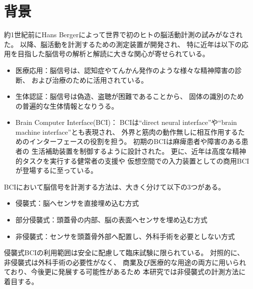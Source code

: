 \section{\mc 背景}
約1世紀前にHans Bergerによって世界で初のヒトの脳活動計測の試みがなされた\cite{宮内1,宮内2,宮内3}。
以降、脳活動を計測するための測定装置が開発され、
特に近年は以下の応用を目指した脳信号の解析と解読に大きな関心が寄せられている。
\begin{itemize}
    \item 医療応用：脳信号は、認知症やてんかん発作のような様々な精神障害の診断、
    および治療のために活用されている\cite{精神疾患,認知症}。
    \item 生体認証：脳信号は偽造、盗聴が困難であることから、
    固体の識別のための普遍的な生体情報となりうる\cite{個人認証,ウェアラブル個人認証}。
    \item Brain Computer Interface(BCI)：
    BCIは``direct neural interface''や``brain machine interface''とも表現され、
    外界と筋肉の動作無しに相互作用するためのインターフェースの役割を担う\cite{DNI}。
    初期のBCIは麻痺患者や障害のある患者の
    生活補助装置を制御するように設計された\cite{BCIbasic}。
    更に、近年は高度な精神的タスクを実行する健常者の支援や
    仮想空間での入力装置としての商用BCIが登場するに至っている\cite{VRBCI,VRBCIsv}。
\end{itemize}
BCIにおいて脳信号を計測する方法は、大きく分けて以下の3つがある。
\begin{itemize}
    \item 侵襲式：脳へセンサを直接埋め込む方式
    \item 部分侵襲式：頭蓋骨の内部、脳の表面へセンサを埋め込む方式
    \item 非侵襲式：センサを頭蓋骨外部へ配置し、外科手術を必要としない方式
\end{itemize}
侵襲式BCIの利用範囲は安全に配慮して臨床試験に限られている。
対照的に、非侵襲式は外科手術の必要性がなく、
商業及び医療的な用途の両方に用いられており、今後更に発展する可能性があるため
本研究では非侵襲式の計測方法に着目する。

